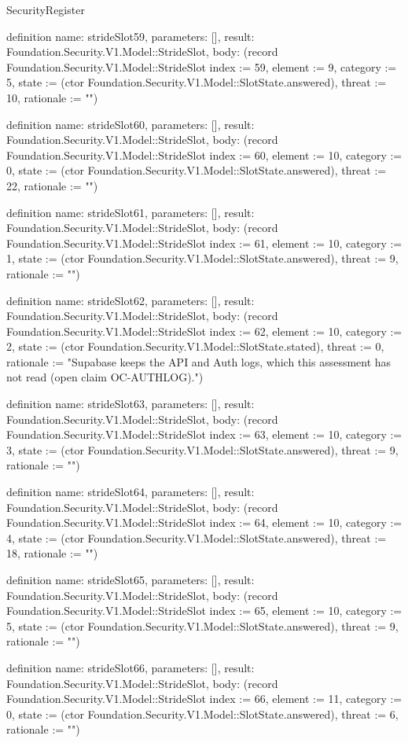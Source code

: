 \begin{lexlean}{SecurityRegister}
\begin{semanticmodule}
definition{
  name: strideSlot59,
  parameters: [],
  result: Foundation.Security.V1.Model::StrideSlot,
  body: (record Foundation.Security.V1.Model::StrideSlot {index := 59, element := 9, category := 5, state := (ctor Foundation.Security.V1.Model::SlotState.answered), threat := 10, rationale := ""})
}

definition{
  name: strideSlot60,
  parameters: [],
  result: Foundation.Security.V1.Model::StrideSlot,
  body: (record Foundation.Security.V1.Model::StrideSlot {index := 60, element := 10, category := 0, state := (ctor Foundation.Security.V1.Model::SlotState.answered), threat := 22, rationale := ""})
}

definition{
  name: strideSlot61,
  parameters: [],
  result: Foundation.Security.V1.Model::StrideSlot,
  body: (record Foundation.Security.V1.Model::StrideSlot {index := 61, element := 10, category := 1, state := (ctor Foundation.Security.V1.Model::SlotState.answered), threat := 9, rationale := ""})
}

definition{
  name: strideSlot62,
  parameters: [],
  result: Foundation.Security.V1.Model::StrideSlot,
  body: (record Foundation.Security.V1.Model::StrideSlot {index := 62, element := 10, category := 2, state := (ctor Foundation.Security.V1.Model::SlotState.stated), threat := 0, rationale := "Supabase keeps the API and Auth logs, which this assessment has not read (open claim OC-AUTHLOG)."})
}

definition{
  name: strideSlot63,
  parameters: [],
  result: Foundation.Security.V1.Model::StrideSlot,
  body: (record Foundation.Security.V1.Model::StrideSlot {index := 63, element := 10, category := 3, state := (ctor Foundation.Security.V1.Model::SlotState.answered), threat := 9, rationale := ""})
}

definition{
  name: strideSlot64,
  parameters: [],
  result: Foundation.Security.V1.Model::StrideSlot,
  body: (record Foundation.Security.V1.Model::StrideSlot {index := 64, element := 10, category := 4, state := (ctor Foundation.Security.V1.Model::SlotState.answered), threat := 18, rationale := ""})
}

definition{
  name: strideSlot65,
  parameters: [],
  result: Foundation.Security.V1.Model::StrideSlot,
  body: (record Foundation.Security.V1.Model::StrideSlot {index := 65, element := 10, category := 5, state := (ctor Foundation.Security.V1.Model::SlotState.answered), threat := 9, rationale := ""})
}

definition{
  name: strideSlot66,
  parameters: [],
  result: Foundation.Security.V1.Model::StrideSlot,
  body: (record Foundation.Security.V1.Model::StrideSlot {index := 66, element := 11, category := 0, state := (ctor Foundation.Security.V1.Model::SlotState.answered), threat := 6, rationale := ""})
}


\end{semanticmodule}
\end{lexlean}
